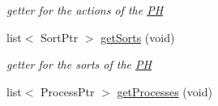 \begin{DoxyCompactItemize}
\begin{DoxyCompactList}\small\item\em getter for the actions of the \hyperlink{class_p_h}{\-P\-H} \end{DoxyCompactList}\item 
\hypertarget{class_p_h_a12e6b41c19521b568df7f86e6979167a}{list$<$ \-Sort\-Ptr $>$ \hyperlink{class_p_h_a12e6b41c19521b568df7f86e6979167a}{get\-Sorts} (void)}\label{class_p_h_a12e6b41c19521b568df7f86e6979167a}

\begin{DoxyCompactList}\small\item\em getter for the sorts of the \hyperlink{class_p_h}{\-P\-H} \end{DoxyCompactList}\item 
\hypertarget{class_p_h_a0155be0ca23e141f4c463f7b6a59051f}{list$<$ \-Process\-Ptr $>$ \hyperlink{class_p_h_a0155be0ca23e141f4c463f7b6a59051f}{get\-Processes} (void)}\label{class_p_h_a0155be0ca23e141f4c463f7b6a59051f}


\end{DoxyCompactItemize}
